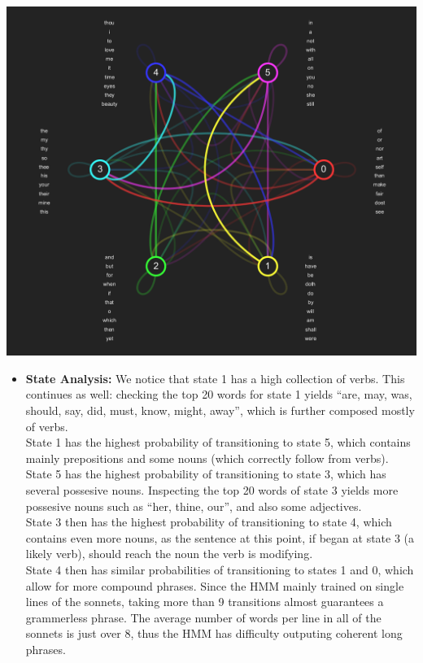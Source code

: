 \begin{itemize}
    \begin{center}
        \includegraphics[scale=.4]{states.png}
    \end{center}

    \pagebreak

    \begin{itemize}
    \item \textbf{State Analysis:}
        We notice that state 1 has a high collection of verbs. This continues
        as well: checking the top 20 words for state 1 yields ``are, may, was,
        should, say, did, must, know, might, away'', which is further composed
        mostly of verbs. \\

        State 1 has the highest probability of transitioning to state 5, which
        contains mainly prepositions and some nouns (which correctly follow
        from verbs). \\

        State 5 has the highest probability of transitioning to state 3, which
        has several possesive nouns. Inspecting the top 20 words of state 3
        yields more possesive nouns such as ``her, thine, our'', and also
        some adjectives. \\

        State 3 then has the highest probability of transitioning to state 4,
        which contains even more nouns, as the sentence at this point, if
        began at state 3 (a likely verb), should reach the noun the verb is
        modifying. \\

        State 4 then has similar probabilities of transitioning to states 1
        and 0, which allow for more compound phrases. Since the HMM mainly
        trained on single lines of the sonnets, taking more than 9 transitions
        almost guarantees a grammerless phrase. The average number of words
        per line in all of the sonnets is just over 8, thus the HMM has
        difficulty outputing coherent long phrases.
    \end{itemize}

\end{itemize}



